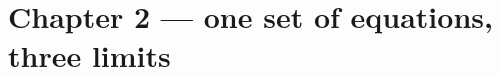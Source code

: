 \documentclass[aspectratio=169,11pt]{beamer}
\begin{document}
%
%
\appendix

\section{Chapter 2 --- one set of equations, three limits}
\end{document}
